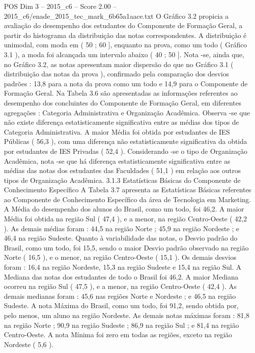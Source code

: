 \begin{textsample}{POS Dim 3 – 2015\_c6 – Score 2.00 – 2015\_c6/enade\_2015\_tec\_mark\_6b65a1aace.txt}
O Gráfico 3.2 propicia a avaliação do desempenho dos estudantes do Componente de Formação Geral, a partir do histograma da distribuição das notas correspondentes.
A distribuição é unimodal, com moda em ( 50 ; 60 ], enquanto na prova, como um todo ( Gráfico 3.1 ), a moda foi alcançada um intervalo abaixo ( 40 ; 50 ].
Nota -se, ainda que, no Gráfico 3.2, as notas apresentam maior dispersão do que no Gráfico 3.1 ( distribuição das notas da prova ), confirmado pela comparação dos desvios padrões : 13,8 para a nota da prova como um todo e 14,9 para o Componente de Formação Geral.
Na Tabela 3.6 são apresentadas as informações referentes ao desempenho dos concluintes do Componente de Formação Geral, em diferentes agregações : Categoria Administrativa e Organização Acadêmica.
Observa -se que não existe diferença estatisticamente significativa entre as médias dos tipos de Categoria Administrativa.
A maior Média foi obtida por estudantes de IES Públicas ( 56,3 ), com uma diferença não estatisticamente significativa da obtida por estudantes de IES Privadas ( 52,4 ).
Considerando -se o tipo de Organização Acadêmica, nota -se que há diferença estatisticamente significativa entre as médias das notas dos estudantes das Faculdades ( 51,1 ) em relação aos outros tipos de Organização Acadêmica. 3.1.3 Estatísticas Básicas do Componente de Conhecimento Específico A Tabela 3.7 apresenta as Estatísticas Básicas referentes ao Componente de Conhecimento Específico da área de Tecnologia em Marketing.
A Média do desempenho dos alunos do Brasil, como um todo, foi 46,2.
A maior Média foi obtida na região Sul ( 47,4 ), e a menor, na região Centro-Oeste ( 42,2 ).
As demais médias foram : 44,5 na região Norte ; 45,9 na região Nordeste ; e 46,4 na região Sudeste.
Quanto à variabilidade das notas, o Desvio padrão do Brasil, como um todo, foi 15,5, sendo o maior Desvio padrão observado na região Norte ( 16,5 ), e o menor, na região Centro-Oeste ( 15,1 ).
Os demais desvios foram : 16,4 na região Nordeste, 15,3 na região Sudeste e 15,4 na região Sul.
A Mediana das notas dos estudantes de todo o Brasil foi 46,2.
A maior Mediana ocorreu na região Sul ( 47,5 ), e a menor, na região Centro-Oeste ( 42,4 ).
As demais medianas foram : 45,6 nas regiões Norte e Nordeste ; e 46,5 na região Sudeste.
A nota Máxima do Brasil, como um todo, foi 91,2, sendo obtida por, pelo menos, um aluno na região Nordeste.
As demais notas máximas foram : 81,8 na região Norte ; 90,9 na região Sudeste ; 86,9 na região Sul ; e 81,4 na região Centro-Oeste.
A nota Mínima foi zero em todas as regiões, exceto na região Nordeste ( 5,6 ).

\end{textsample}
